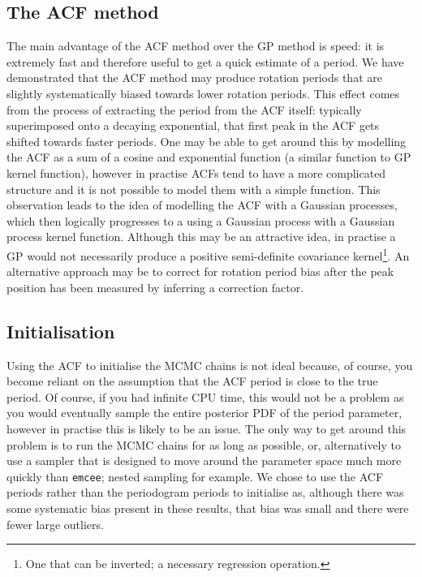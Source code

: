 \subsection{The ACF method}
The main advantage of the ACF method over the GP method is speed: it is
extremely fast and therefore useful to get a quick estimate of a period.
We have demonstrated that the ACF method may produce rotation periods that are
slightly systematically biased towards lower rotation periods.
This effect comes from the process of extracting the period from the ACF
itself: typically superimposed onto a decaying exponential, that first peak in
the ACF gets shifted towards faster periods.
One may be able to get around this by modelling the ACF as a sum of a cosine
and exponential function (a similar function to GP kernel function), however
in practise ACFs tend to have a more complicated structure and it is not
possible to model them with a simple function.
This observation leads to the idea of modelling the ACF with a Gaussian
processes, which then logically progresses to a using a Gaussian process with
a Gaussian process kernel function.
Although this may be an attractive idea, in practise a GP would not
necessarily produce a positive semi-definite covariance kernel\footnote{One
that can be inverted; a necessary regression operation.}.
An alternative approach may be to correct for rotation period bias after the
peak position has been measured by inferring a correction factor.

\subsection{Initialisation}
Using the ACF to initialise the MCMC chains is not ideal because, of course,
you become reliant on the assumption that the ACF period is close to the true
period.
Of course, if you had infinite CPU time, this would not be a problem as you
would eventually sample the entire posterior PDF of the period parameter,
however in practise this is likely to be an issue.
The only way to get around this problem is to run the MCMC chains for as long
as possible, or, alternatively to use a sampler that is designed to move
around the parameter space much more quickly than {\tt emcee}; nested sampling
for example.
We chose to use the ACF periods rather than the periodogram periods to
initialise as, although there was some systematic bias present in these
results, that bias was small and there were fewer large outliers.

